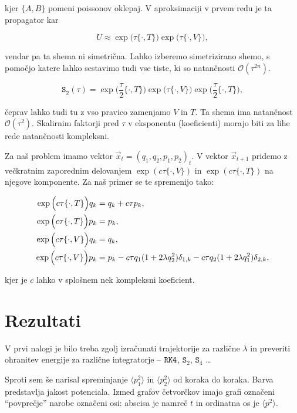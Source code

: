 \documentclass[a4 paper, 12pt]{article}
\begin{document}
kjer $\{A,B\}$ pomeni poissonov oklepaj. V aproksimaciji v prvem redu je ta propagator kar

\begin{equation}
	U \approx \exp\Big(\tau\{\cdot, T\}\Big)\exp\Big(\tau\{\cdot, V\}\Big),
\end{equation}

vendar pa ta shema ni simetrična. Lahko izberemo simetrizirano shemo, s pomočjo katere lahko sestavimo tudi vse tiste,
ki so natančnosti $\mathcal{O}(\tau^{2n})$.

\begin{equation}
	\mathtt{S_2} (\tau) = \exp\bigg(\frac{\tau}{2}\{\cdot, T\}\bigg) \exp\bigg(\tau\{\cdot, V\}\bigg)
		\exp\bigg(\frac{\tau}{2}\{\cdot, T\}\bigg),
\end{equation}

čeprav lahko tudi tu z vso pravico zamenjamo $V$ in $T$. Ta shema ima natančnost $\mathcal{O}(\tau^2)$. Skalirnim
faktorji pred $\tau$ v eksponentu (koeficienti) morajo biti za lihe rede natančnosti kompleksni.

Za naš problem imamo vektor $\vec{x}_t = (q_1, q_2, p_1, p_2)_t$. V vektor $\vec{x}_{t+1}$ pridemo z večkratnim
zaporednim delovanjem $\exp(c\tau\{\cdot,V\})$ in $\exp(c\tau\{\cdot,T\})$ na njegove komponente. Za naš primer se te
spremenijo tako:

\begin{align}
	\exp\Big(c\tau\{\cdot, T\}\Big)q_k &= q_k + c\tau p_k, \notag \\
	\exp\Big(c\tau\{\cdot, T\}\Big)p_k &= p_k, \notag \\
	\exp\Big(c\tau\{\cdot, V\}\Big)q_k &= q_k, \notag \\
	\exp\Big(c\tau\{\cdot, V\}\Big)p_k &= p_k - c\tau q_1 (1 + 2\lambda q_2^2) \delta_{1,k} - c\tau q_2
		(1 + 2\lambda q_1^2) \delta_{2,k},
\end{align}

kjer je $c$ lahko v splošnem nek kompleksni koeficient.

\section{Rezultati}

V prvi nalogi je bilo treba zgolj izračunati trajektorije za različne $\lambda$ in preveriti ohranitev energije za
različne integratorje -- ${\tt RK4}$, ${\mathtt S_2}$, ${\mathtt S_4}$ \ldots

Sproti sem še narisal spreminjanje $\langle p_1^2 \rangle$ in $\langle p_2^2 \rangle$ od koraka do koraka. Barva
predstavlja jakost potenciala. Izmed grafov četvorčkov imajo grafi označeni "`povprečje"' narobe označeni osi:
abscisa je namreč $t$ in ordinatna os je $\langle p^2 \rangle$.
\end{document}
